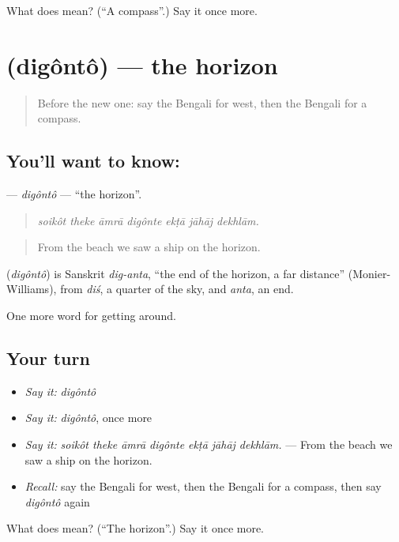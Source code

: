 \begin{tcolorbox}[breakable,colback=teal!4,colframe=teal!35!black,title={Before you move on}]
What does  mean? (\textquotedblleft{}A compass\textquotedblright{}.) Say it once more.
\end{tcolorbox}
\section[\texorpdfstring{\bn{দিগন্ত} (digôntô)}{দিগন্ত (digôntô)}]{ (digôntô) — the horizon}

\label{lesson:BN-C401-digonto}



\begin{quote}
Before the new one: say the Bengali for west, then the Bengali for a compass.
\end{quote}

\subsection*{You'll want to know: }
\textbf{} — \emph{digôntô} — \textquotedblleft{}the horizon\textquotedblright{}.

\begin{quote}
      
\end{quote}

\begin{quote}
\emph{soikôt theke āmrā digônte ekṭā jāhāj dekhlām.}
\end{quote}

\begin{quote}
From the beach we saw a ship on the horizon.
\end{quote}

\begin{cousinweb}
\textbf{} (\emph{digôntô}) is Sanskrit \emph{dig-anta}, \textquotedblleft{}the end of the horizon, a far distance\textquotedblright{} (Monier-Williams), from \emph{diś}, a quarter of the sky, and \emph{anta}, an end.
\end{cousinweb}

\begin{grammarlens}[title={What you've built}]
One more word for getting around.
\end{grammarlens}

\subsection*{Your turn}
\begin{itemize}
\raggedright
  \item \emph{Say it:} \emph{digôntô}
  \item \emph{Say it:} \emph{digôntô}, once more
  \item \emph{Say it:} \emph{soikôt theke āmrā digônte ekṭā jāhāj dekhlām.} — From the beach we saw a ship on the horizon.
  \item \emph{Recall:} say the Bengali for west, then the Bengali for a compass, then say \emph{digôntô} again
\end{itemize}

\begin{tcolorbox}[breakable,colback=teal!4,colframe=teal!35!black,title={Before you move on}]
What does  mean? (\textquotedblleft{}The horizon\textquotedblright{}.) Say it once more.
\end{tcolorbox}
